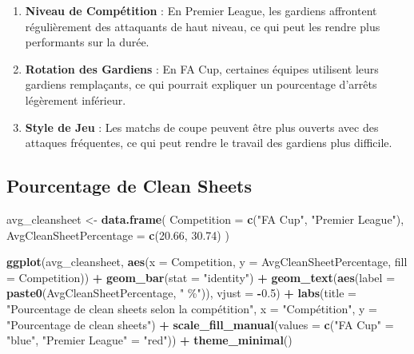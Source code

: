 \documentclass[
]{article}
\newenvironment{Shaded}{\begin{snugshade}}{\end{snugshade}}
\newcommand{\AttributeTok}[1]{\textcolor[rgb]{0.13,0.29,0.53}{#1}}
\newcommand{\FloatTok}[1]{\textcolor[rgb]{0.00,0.00,0.81}{#1}}
\newcommand{\FunctionTok}[1]{\textcolor[rgb]{0.13,0.29,0.53}{\textbf{#1}}}
\newcommand{\NormalTok}[1]{#1}
\newcommand{\OtherTok}[1]{\textcolor[rgb]{0.56,0.35,0.01}{#1}}
\newcommand{\SpecialCharTok}[1]{\textcolor[rgb]{0.81,0.36,0.00}{\textbf{#1}}}
\newcommand{\StringTok}[1]{\textcolor[rgb]{0.31,0.60,0.02}{#1}}
\providecommand{\tightlist}{%
  \setlength{\itemsep}{0pt}\setlength{\parskip}{0pt}}
\begin{document}
\begin{enumerate}
\def\labelenumi{\arabic{enumi}.}
\tightlist
\item
  \textbf{Niveau de Compétition} : En Premier League, les gardiens
  affrontent régulièrement des attaquants de haut niveau, ce qui peut
  les rendre plus performants sur la durée.
\item
  \textbf{Rotation des Gardiens} : En FA Cup, certaines équipes
  utilisent leurs gardiens remplaçants, ce qui pourrait expliquer un
  pourcentage d'arrêts légèrement inférieur.
\item
  \textbf{Style de Jeu} : Les matchs de coupe peuvent être plus ouverts
  avec des attaques fréquentes, ce qui peut rendre le travail des
  gardiens plus difficile.
\end{enumerate}

\subsection{Pourcentage de Clean
Sheets}\label{pourcentage-de-clean-sheets}

\begin{Shaded}
\begin{Highlighting}[]
\NormalTok{avg\_cleansheet }\OtherTok{\textless{}{-}} \FunctionTok{data.frame}\NormalTok{(}
  \AttributeTok{Competition =} \FunctionTok{c}\NormalTok{(}\StringTok{"FA Cup"}\NormalTok{, }\StringTok{"Premier League"}\NormalTok{),}
  \AttributeTok{AvgCleanSheetPercentage =} \FunctionTok{c}\NormalTok{(}\FloatTok{20.66}\NormalTok{, }\FloatTok{30.74}\NormalTok{)}
\NormalTok{)}

\FunctionTok{ggplot}\NormalTok{(avg\_cleansheet, }\FunctionTok{aes}\NormalTok{(}\AttributeTok{x =}\NormalTok{ Competition, }\AttributeTok{y =}\NormalTok{ AvgCleanSheetPercentage, }\AttributeTok{fill =}\NormalTok{ Competition)) }\SpecialCharTok{+}
  \FunctionTok{geom\_bar}\NormalTok{(}\AttributeTok{stat =} \StringTok{"identity"}\NormalTok{) }\SpecialCharTok{+}
  \FunctionTok{geom\_text}\NormalTok{(}\FunctionTok{aes}\NormalTok{(}\AttributeTok{label =} \FunctionTok{paste0}\NormalTok{(AvgCleanSheetPercentage, }\StringTok{" \%"}\NormalTok{)), }\AttributeTok{vjust =} \SpecialCharTok{{-}}\FloatTok{0.5}\NormalTok{) }\SpecialCharTok{+}
  \FunctionTok{labs}\NormalTok{(}\AttributeTok{title =} \StringTok{"Pourcentage de clean sheets selon la compétition"}\NormalTok{,}
       \AttributeTok{x =} \StringTok{"Compétition"}\NormalTok{, }\AttributeTok{y =} \StringTok{"Pourcentage de clean sheets"}\NormalTok{) }\SpecialCharTok{+}
  \FunctionTok{scale\_fill\_manual}\NormalTok{(}\AttributeTok{values =} \FunctionTok{c}\NormalTok{(}\StringTok{"FA Cup"} \OtherTok{=} \StringTok{"blue"}\NormalTok{, }\StringTok{"Premier League"} \OtherTok{=} \StringTok{"red"}\NormalTok{)) }\SpecialCharTok{+}
  \FunctionTok{theme\_minimal}\NormalTok{()}
\end{Highlighting}
\end{Shaded}
\end{document}
